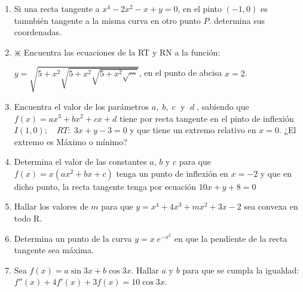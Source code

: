 \begin{enumerate}
\rightline{\textcolor{gris}{Solución: $a=-1; \; b=3$}} 

\item Si una recta tangente a $x^4-2x^2-x+y=0$, en el pinto $(-1,0)$ es tamnbién tangente a la misma curva en otro punto $P$. determina sus coordenadas.

\rightline{\textcolor{gris}{Solución: $P(1,2)$}}

\item $\divideontimes$ Encuentra las ecuaciones de la RT y RN a la función:
 
$y=\sqrt{5+x^2\sqrt{5+x^2\sqrt{5+x^2\sqrt{\cdots}}}}$, en el punto de abcisa $x=2$.

\rightline{\textcolor{gris}{Solución: $RT:\; 10x-3y-5=0; \quad RN\; 3x+10y-56=0$}}

\item Encuentra el valor de los parámetros $a,\; b,\; c\; $ y $\; d\; $, sabiendo que $f(x)=ax^3+bx^2+cx+d$ tiene por recta tangente en el pinto de inflexión $I(1,0); \quad RT:\; 3x+y-3=0$ y que tiene un extremo relativo en $x=0$. ¿El extremo es Máximo o mínimo?

\rightline{\textcolor{gris}{Solución: $a=3;\;b=-9;\;c=6;\;d=0$}}

\item Determina el valor de las constantes $a$, $b$ y $c$ para que $f(x)=x(ax^2+bx+c)$ tenga un punto de inflexión en $x=-2$ y que en dicho punto, la recta tangente tenga por ecuación $10x+y+8=0$ 

\rightline{\textcolor{gris}{Solución: $a=1; \; b=6; \; c=2$}}

\item Hallar los valores de $m$ para que $y=x^4+4x^3+mx^2+3x-2$ sea convexa en todo $\mathrm{R}$.

\rightline{\textcolor{gris}{Solución: $m\ge6$}}

\item Determina un punto de la curva $y=x\; e^{-x^2}$ en que la pendiente de la recta tangente sea máxima.

\rightline{\textcolor{gris}{Solución: $x=0$}}

\item Sea $f(x)=a\sin 3x +b\cos 3x$. Hallar $a$ y $b$ para que se cumpla la igualdad: $f''(x)+4f'(x)+3f(x)=10\cos 3x$.

\rightline{\textcolor{gris}{Solución: $a=2/3; \; b=-1/3$}}


\end{enumerate}
